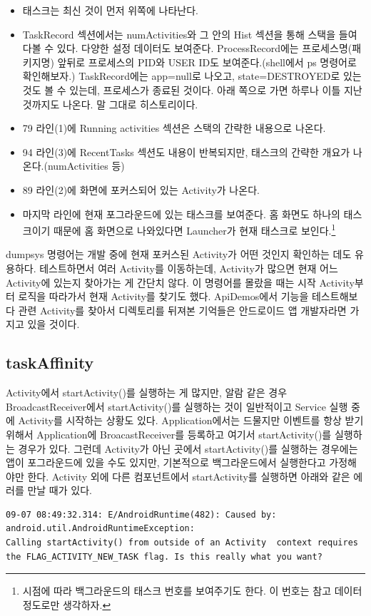 \begin{itemize}
\item 태스크는 최신 것이 먼저 위쪽에 나타난다.
\item TaskRecord 섹션에서는 numActivities와 그 안의 Hist 섹션을 통해 스택을 들여다볼 수 있다. 다양한 설정 데이터도 보여준다. ProcessRecord에는 프로세스명(패키지명) 앞뒤로 프로세스의 PID와 USER ID도 보여준다.(shell에서 ps 명령어로 확인해보자.)
TaskRecord에는 app=null로 나오고, state=DESTROYED로 있는 것도 볼 수 있는데, 프로세스가 종료된 것이다. 아래 쪽으로 가면 하루나 이틀 지난 것까지도 나온다. 말 그대로 히스토리이다. 
\item 79 라인(1)에 Running activities 섹션은 스택의 간략한 내용으로 나온다.
\item 94 라인(3)에 RecentTasks 섹션도 내용이 반복되지만, 태스크의 간략한 개요가 나온다.(numActivities 등)
\item 89 라인(2)에 화면에 포커스되어 있는 Activity가 나온다.
\item 마지막 라인에 현재 포그라운드에 있는 태스크를 보여준다. 홈 화면도 하나의 태스크이기 때문에 홈 화면으로 나와있다면 Launcher가 현재 태스크로 보인다.\footnote{시점에 따라 백그라운드의 태스크 번호를 보여주기도 한다. 이 번호는 참고 데이터 정도로만 생각하자.}
\end{itemize}
dumpsys 명령어는 개발 중에 현재 포커스된 Activity가 어떤 것인지 확인하는 데도 유용하다.
테스트하면서 여러 Activity를 이동하는데, Activity가 많으면 현재 어느 Activity에 있는지 찾아가는 게 간단치 않다.
이 명령어를 몰랐을 때는 시작 Activity부터 로직을 따라가서 현재 Activity를 찾기도 했다. ApiDemos에서 기능을 테스트해보다 관련 Activity를 찾아서 디렉토리를 뒤져본 기억들은 안드로이드 앱 개발자라면 가지고 있을 것이다.

\subsection{taskAffinity}
Activity에서 startActivity()를 실행하는 게 많지만, 알람 같은 경우 BroadcastReceiver에서 startActivity()를 실행하는 것이 일반적이고 Service 실행 중에 Activity를 시작하는 상황도 있다. Application에서는 드물지만 이벤트를 항상 받기 위해서 Application에 BroacastReceiver를 등록하고 여기서 startActivity()를 실행하는 경우가 있다.
그런데 Activity가 아닌 곳에서 startActivity()를 실행하는 경우에는 앱이 포그라운드에 있을 수도 있지만, 기본적으로 백그라운드에서 실행한다고 가정해야만 한다. Activity 외에 다른 컴포넌트에서 startActivity를 실행하면 아래와 같은 에러를 만날 때가 있다.
\begin{lstlisting}[frame=single]
09-07 08:49:32.314: E/AndroidRuntime(482): Caused by: android.util.AndroidRuntimeException: 
Calling startActivity() from outside of an Activity  context requires 
the FLAG_ACTIVITY_NEW_TASK flag. Is this really what you want?
\end{lstlisting}

